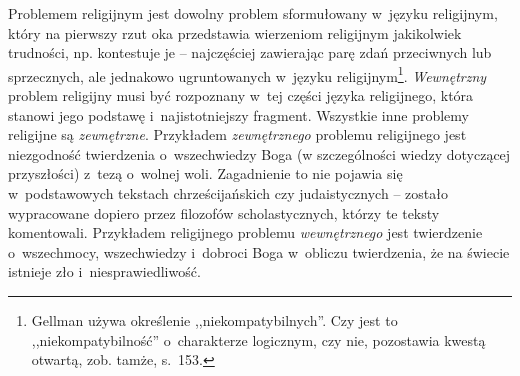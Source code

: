 Problemem religijnym jest dowolny problem sformułowany w~języku religijnym, który na pierwszy rzut oka przedstawia wierzeniom religijnym jakikolwiek trudności, np. kontestuje je -- najczęściej zawierając parę zdań przeciwnych lub sprzecznych, ale jednakowo ugruntowanych w~języku religijnym\footnote{Gellman używa określenie ,,niekompatybilnych''. Czy jest to ,,niekompatybilność'' o~charakterze logicznym, czy nie, pozostawia kwestą otwartą, zob. tamże, s.~153.}. \textit{Wewnętrzny} problem religijny musi być rozpoznany w~tej części języka religijnego, która stanowi jego podstawę i~najistotniejszy fragment. Wszystkie inne problemy religijne są \textit{zewnętrzne}. Przykładem \textit{zewnętrznego} problemu religijnego jest niezgodność twierdzenia o~wszechwiedzy Boga (w szczególności wiedzy dotyczącej przyszłości) z~tezą o~wolnej woli. Zagadnienie to nie pojawia się w~podstawowych tekstach chrześcijańskich czy judaistycznych -- zostało wypracowane dopiero przez filozofów scholastycznych, którzy te teksty komentowali. Przykładem religijnego problemu \textit{wewnętrznego} jest twierdzenie o~wszechmocy, wszechwiedzy i~dobroci Boga w~obliczu twierdzenia, że na świecie istnieje zło i~niesprawiedliwość.

